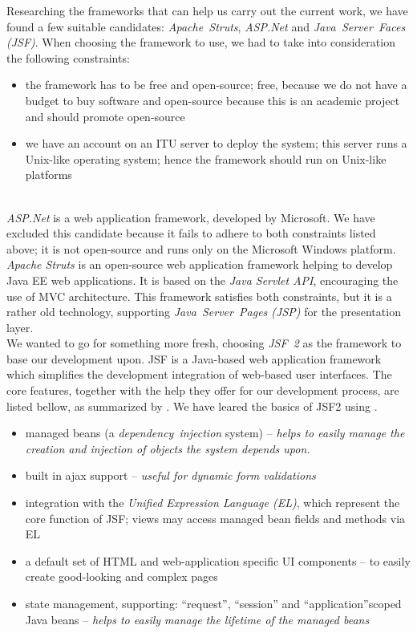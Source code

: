 \noindent Researching the frameworks that can help us carry out the current work,
we have found a few suitable candidates: \emph{Apache~Struts}, \emph{ASP.Net}
and \emph{Java~Server~Faces (JSF)}. When choosing the framework to use, we had
to take into consideration the following constraints:
\begin{itemize}
  \item the framework has to be free and open-source; free, because we do not
  have a budget to buy software and open-source because this is an academic
  project and should promote open-source
  \item we have an account on an ITU server to deploy the system; this
  server runs a Unix-like operating system; hence the framework should run on
  Unix-like platforms
\end{itemize}\\

\noindent \emph{ASP.Net} is a web application framework, developed by
Microsoft. We have excluded this candidate because it fails to adhere to both constraints
listed above; it is not open-source and runs only on the Microsoft Windows
platform.\\

\noindent \emph{Apache Struts} is an open-source web application framework
helping to develop Java EE web applications. It is based on the \emph{Java Servlet API},
encouraging the use of MVC architecture. This framework satisfies both
constraints, but it is a rather old technology, supporting
\emph{Java~Server~Pages (JSP)} for the presentation layer.\\

\noindent We wanted to go for something more fresh, choosing \emph{JSF~2}
as the framework to base our development upon. JSF is a Java-based web application
framework which simplifies the development integration of web-based user
interfaces. The core features, together with the help they offer for our
development process, are listed bellow, as summarized by \cite{wiki}. We have
leared the basics of JSF2 using \cite{Geary:3}.
\begin{itemize}
  \item managed beans (a \emph{dependency~injection} system) -- \emph{helps to
  easily manage the creation and injection of objects the system depends upon.}
  \item built in ajax support -- \emph{useful for dynamic form validations}
  \item integration with the \emph{Unified Expression Language (EL)}, which
  represent the core function of JSF; views may access managed bean fields and
  methods via EL
  \item a default set of HTML and web-application specific UI components -- to
  easily create good-looking and complex pages
  \item state management, supporting: ``request'', ``session'' and
  ``application''scoped Java beans -- \emph{helps to easily manage the lifetime
  of the managed beans}
\end{itemize}

